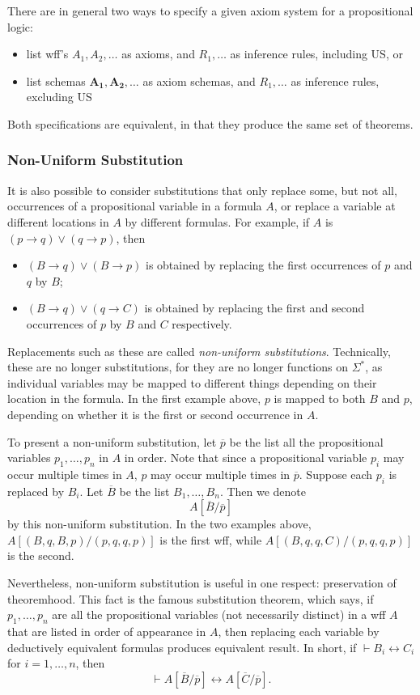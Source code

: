 \documentclass[12pt]{article}
\begin{document}
There are in general two ways to specify a given axiom system for a propositional logic:
\begin{itemize}
\item list wff's $A_1,A_2,\ldots$ as axioms, and $R_1,\ldots$ as inference rules, including US, or
\item list schemas $\mathbf{A_1},\mathbf{A_2},\ldots$ as axiom schemas, and $R_1,\ldots$ as inference rules, excluding US
\end{itemize}
Both specifications are equivalent, in that they produce the same set of theorems.

\subsubsection*{Non-Uniform Substitution}
It is also possible to consider substitutions that only replace some, but not all, occurrences of a propositional variable in a formula $A$, or replace a variable at different locations in $A$ by different formulas.  For example, if $A$ is $(p\to q)\lor (q\to p)$, then 
\begin{itemize}
\item
$(B\to q)\lor (B\to p)$ is obtained by replacing the first occurrences of $p$ and $q$ by $B$;
\item
$(B\to q)\lor (q\to C)$ is obtained by replacing the first and second occurrences of $p$ by $B$ and $C$ respectively.
\end{itemize}
Replacements such as these are called \emph{non-uniform substitutions}.  Technically, these are no longer substitutions, for they are no longer functions on $\Sigma^*$, as individual variables may be mapped to different things depending on their location in the formula.  In the first example above, $p$ is mapped to both $B$ and $p$, depending on whether it is the first or second occurrence in $A$.

To present a non-uniform substitution, let $\overline{p}$ be the list all the propositional variables $p_1, \ldots, p_n$ in $A$ in order.  Note that since a propositional variable $p_i$ may occur multiple times in $A$, $p$ may occur multiple times in $\overline{p}$.  Suppose each $p_i$ is replaced by $B_i$.  Let $\overline{B}$ be the list $B_1,\ldots, B_n$.  Then we denote $$A[\overline{B}/\overline{p}]$$ by this non-uniform substitution.  In the two examples above, $A[(B,q,B,p)/(p,q,q,p)]$ is the first wff, while $A[(B,q,q,C)/(p,q,q,p)]$ is the second.

Nevertheless, non-uniform substitution is useful in one respect: preservation of theoremhood.  This fact is the famous substitution theorem, which says, if $p_1,\ldots, p_n$ are all the propositional variables (not necessarily distinct) in a wff $A$ that are listed in order of appearance in $A$, then replacing each variable by deductively equivalent formulas produces equivalent result.  In short, if $\vdash B_i \leftrightarrow C_i$ for $i=1,\ldots, n$, then $$\vdash A[\overline{B}/\overline{p}] \leftrightarrow A[\overline{C}/\overline{p}].$$
\end{document}
